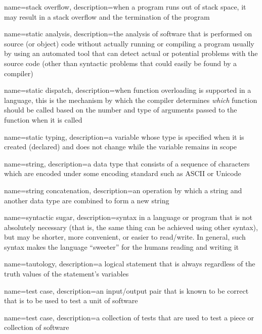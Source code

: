 {
  name=stack overflow,
  description={when a program runs out of stack space, it may result in a stack overflow and the termination of the program}
}

{
  name=static analysis,
  description={the analysis of software that is performed on source (or object) code without actually running or compiling a program usually by using an automated tool that can detect actual or potential problems with the source code (other than syntactic problems that could easily be found by a compiler)}
}

{
  name=static dispatch,
  description={when function overloading is supported in a language, this is the mechanism by which the compiler determines \emph{which} function should be called based on the number and type of arguments passed to the function when it is called}
}

{
  name=static typing,
  description={a variable whose type is specified when it is created (declared) and does not change while the
  	variable remains in scope}
}

{
  name=string,
  description={a data type that consists of a sequence of characters which are encoded under some encoding standard such as ASCII or Unicode}
}

{
  name=string concatenation,
  description={an operation by which a string and another data type are combined to form a new string}
}

{
  name=syntactic sugar,
  description={syntax in a language or program that is not absolutely necessary (that is, the
  	same thing can be achieved using other syntax), but may be shorter, more convenient, or
	easier to read/write.  In general, such syntax makes the language ``sweeter'' for the
	humans reading and writing it}
}

{
  name=tautology,
  description={a logical statement that is always \True regardless of the truth values of the statement's variables}
}

{
  name=test case,
  description={an input/output pair that is known to be correct that is to be used to test a unit of software}
}

{
  name=test case,
  description={a collection of tests that are used to test a piece or collection of software}
}


